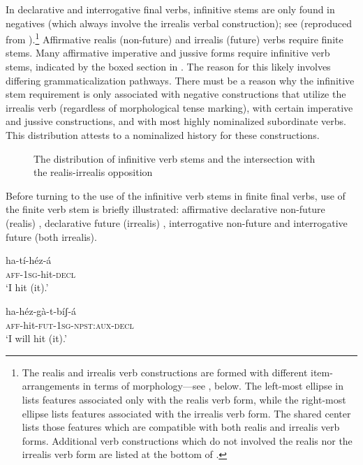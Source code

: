 \documentclass[output=paper]{langsci/langscibook}
\begin{document}
In declarative and interrogative final verbs, infinitive stems are only found in negatives (which always involve the irrealis verbal construction); see  (reproduced from \citealt[266]{Ahland2012}).\footnote{The realis and irrealis verb constructions are formed with different item-arrangements in terms of morphology—see , below. The left-most ellipse in  lists features associated only with the realis verb form, while the right-most ellipse lists features associated with the irrealis verb form. The shared center lists those features which are compatible with both realis and irrealis verb forms. Additional verb constructions which do not involved the realis nor the irrealis verb form are listed at the bottom of .} Affirmative realis (non-future) and irrealis (future) verbs require finite stems. Many affirmative imperative and jussive forms require infinitive verb stems, indicated by the boxed section in . The reason for this likely involves differing grammaticalization pathways. There must be a reason why the infinitive stem requirement is only associated with negative constructions that utilize the irrealis verb (regardless of morphological tense marking), with certain imperative and jussive constructions, and with most highly nominalized subordinate verbs. This distribution attests to a nominalized history for these constructions. 
 

\begin{sidewaysfigure}
\resizebox{\textwidth}{!}{}
\caption{The distribution of infinitive verb stems and the intersection with the realis-irrealis opposition}
\label{fig:2}
\end{sidewaysfigure}


Before turning to the use of the infinitive verb stems in finite final verbs, use of the finite verb stem is briefly illustrated: affirmative declarative non-future (realis) , declarative future (irrealis) , interrogative non-future  and interrogative future  (both irrealis).

\ea\label{ex:mahland:52}
\gll ha-tí-héz-{\downstep}á\\
\textsc{aff-1sg}{}-hit-\textsc{decl} \\
\glt `I hit (it).'
\z

\ea\label{ex:mahland:53}
\gll ha-héz-gà-t-bíʃ-á\\
\textsc{aff}{}-hit-\textsc{fut-1sg-npst:aux-decl} \\
\glt `I will hit (it).'
\z
\end{document}
